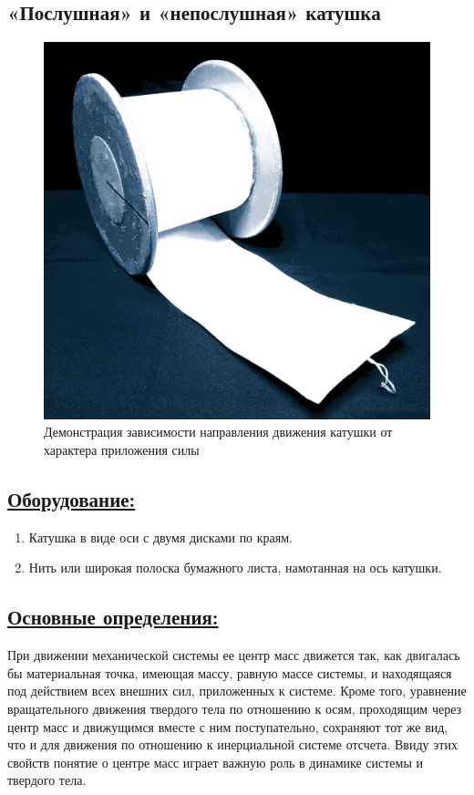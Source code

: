 \documentclass[14pt,a4paper,oneside]{extarticle}	%
\begin{document}

\begin{center}
	\subsection*{«Послушная» и  «непослушная» катушка}
\end{center}

\begin{figure}[H] 
	\centering 	
	\includegraphics[width=0.6\linewidth]{roll-1.png}
	\caption{Демонстрация зависимости направления движения катушки от характера приложения силы}
	\label{roll-1}
\end{figure}

\subsection*{\underline{Оборудование:}}

\begin{enumerate}
	\item Катушка в виде оси с двумя дисками по краям.
	\item Нить или широкая полоска бумажного листа, намотанная на ось катушки.
\end{enumerate}

\subsection*{\underline{Основные определения:}}

При движении механической системы ее центр масс движется так, как двигалась бы материальная точка, имеющая массу, равную массе системы, и находящаяся под действием всех внешних сил, приложенных к системе. 
Кроме того, уравнение вращательного движения твердого тела по отношению к осям, проходящим через центр масс и движущимся вместе с ним поступательно, сохраняют тот же вид, что и для движения по отношению к инерциальной системе отсчета.
Ввиду этих свойств понятие о центре масс играет важную роль в динамике системы и твердого тела.
\end{document}
